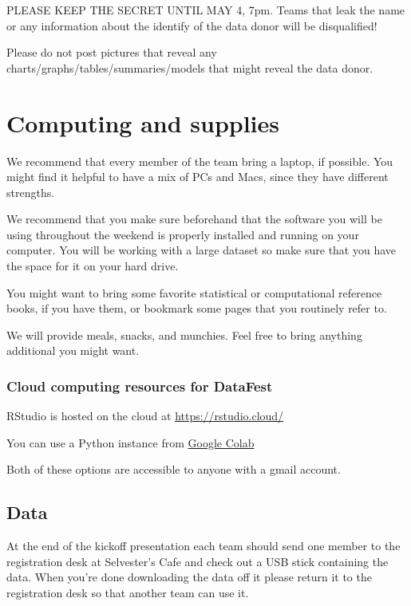 \documentclass[]{article}
\begin{document}
PLEASE KEEP THE SECRET UNTIL MAY 4, 7pm. Teams that leak the name or any
information about the identify of the data donor will be disqualified!

Please do not post pictures that reveal any
charts/graphs/tables/summaries/models that might reveal the data donor.

\hypertarget{computing-and-supplies}{%
\section{Computing and supplies}\label{computing-and-supplies}}

We recommend that every member of the team bring a laptop, if possible.
You might find it helpful to have a mix of PCs and Macs, since they have
different strengths.

We recommend that you make sure beforehand that the software you will be
using throughout the weekend is properly installed and running on your
computer. You will be working with a large dataset so make sure that you
have the space for it on your hard drive.

You might want to bring some favorite statistical or computational
reference books, if you have them, or bookmark some pages that you
routinely refer to.

We will provide meals, snacks, and munchies. Feel free to bring anything
additional you might want.

\hypertarget{cloud-computing-resources-for-datafest}{%
\subsubsection{Cloud computing resources for
DataFest}\label{cloud-computing-resources-for-datafest}}

RStudio is hosted on the cloud at \url{https://rstudio.cloud/}

You can use a Python instance from
\href{https://colab.research.google.com/}{Google Colab}

Both of these options are accessible to anyone with a gmail account.

\hypertarget{data}{%
\subsection{Data}\label{data}}

At the end of the kickoff presentation each team should send one member
to the registration desk at Selvester's Cafe and check out a USB stick
containing the data. When you're done downloading the data off it please
return it to the registration desk so that another team can use it.
\end{document}
